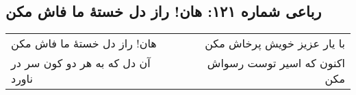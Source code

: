 \begin{center}
\section*{رباعی شماره ۱۲۱: هان! راز دل خستهٔ ما فاش مکن}
\label{sec:121}
\begin{longtable}{l p{0.5cm} r}
هان! راز دل خستهٔ ما فاش مکن
&&
با یار عزیز خویش پرخاش مکن
\\
آن دل که به هر دو کون سر در ناورد
&&
اکنون که اسیر توست رسواش مکن
\\
\end{longtable}
\end{center}
